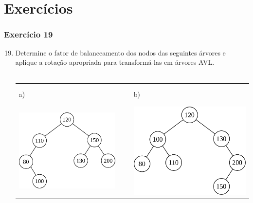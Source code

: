 \documentclass[aspectratio=169]{beamer}
\begin{document}
\section{Exercícios}

\begin{frame}[fragile]\frametitle{Exercício 19}
\begin{enumerate}
	\setcounter{enumi}{18}
	\item Determine o fator de balanceamento dos nodos das seguintes árvores e aplique a rotação apropriada para transformá-las em árvores AVL.\\~\\
\begin{tabular}{lll}
a) & ~ ~ & b)\\
\includegraphics[height=0.4\paperheight]{imagens/avl17.png} & ~ ~ &
\includegraphics[height=0.4\paperheight]{imagens/avl18.png} \\
\end{tabular}
\end{enumerate}
\end{frame}
\end{document}
